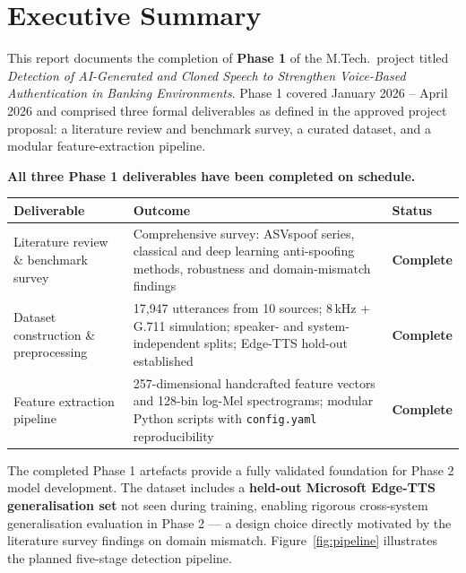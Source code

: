 \documentclass[12pt,a4paper]{report}
\newcommand{\statuscomplete}{\colorbox{statusgreen}{\color{white}\textbf{\small Complete}}}
\begin{document}
\chapter{Executive Summary}

This report documents the completion of \textbf{Phase 1} of the M.Tech.\ project titled
\textit{Detection of AI-Generated and Cloned Speech to Strengthen Voice-Based Authentication
in Banking Environments}. Phase 1 covered January 2026 -- April 2026 and comprised three
formal deliverables as defined in the approved project proposal: a literature review and
benchmark survey, a curated dataset, and a modular feature-extraction pipeline.

\textbf{All three Phase 1 deliverables have been completed on schedule.}

\medskip
\begin{center}
\begin{tabular}{L{4.2cm}L{6.8cm}C{2cm}}
  \toprule
  \color{white}\textbf{Deliverable} &
  \color{white}\textbf{Outcome} &
  \color{white}\textbf{Status} \\
  \midrule
  Literature review \& benchmark survey &
  Comprehensive survey: ASVspoof series, classical and deep learning anti-spoofing methods,
  robustness and domain-mismatch findings &
  \statuscomplete \\[4pt]
  Dataset construction \& preprocessing &
  17{,}947 utterances from 10 sources; 8\,kHz + G.711 simulation; speaker- and
  system-independent splits; Edge-TTS hold-out established &
  \statuscomplete \\[4pt]
  Feature extraction pipeline &
  257-dimensional handcrafted feature vectors and 128-bin log-Mel spectrograms;
  modular Python scripts with \texttt{config.yaml} reproducibility &
  \statuscomplete \\
  \bottomrule
\end{tabular}
\end{center}

\medskip
The completed Phase 1 artefacts provide a fully validated foundation for Phase 2 model
development. The dataset includes a \textbf{held-out Microsoft Edge-TTS generalisation
set} not seen during training, enabling rigorous cross-system generalisation evaluation in
Phase 2 --- a design choice directly motivated by the literature survey findings on domain
mismatch. Figure~\ref{fig:pipeline} illustrates the planned five-stage detection pipeline.
\end{document}
